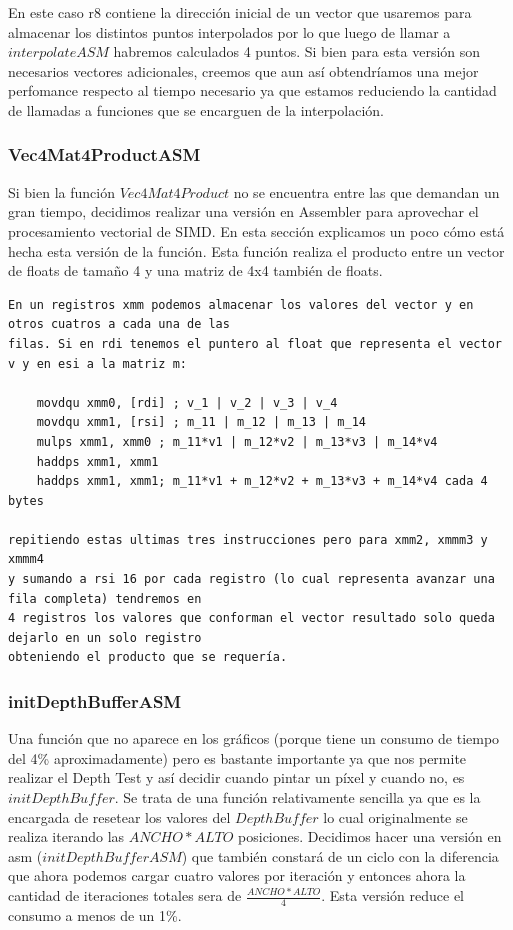 \documentclass[a4paper]{article}
\begin{document}
En este caso r8 contiene la dirección inicial de un vector que usaremos para almacenar los distintos puntos interpolados por lo que luego de llamar a $interpolateASM$ habremos calculados 4 puntos. Si bien para esta versión son necesarios vectores adicionales, creemos que aun así obtendríamos una mejor perfomance respecto al tiempo necesario ya que estamos reduciendo la cantidad de llamadas a funciones que se encarguen de la interpolación.

\subsubsection{Vec4Mat4ProductASM}
Si bien la función $Vec4Mat4Product$ no se encuentra entre las que demandan un gran tiempo, decidimos realizar una versión en Assembler para aprovechar el procesamiento vectorial de SIMD. En esta sección explicamos un poco cómo está hecha esta versión de la función. Esta función realiza el producto entre un vector de floats de tamaño 4 y una matriz de 4x4 también de floats. 
\begin{verbatim}
En un registros xmm podemos almacenar los valores del vector y en otros cuatros a cada una de las 
filas. Si en rdi tenemos el puntero al float que representa el vector v y en esi a la matriz m:

    movdqu xmm0, [rdi] ; v_1 | v_2 | v_3 | v_4
    movdqu xmm1, [rsi] ; m_11 | m_12 | m_13 | m_14
    mulps xmm1, xmm0 ; m_11*v1 | m_12*v2 | m_13*v3 | m_14*v4
    haddps xmm1, xmm1 
    haddps xmm1, xmm1; m_11*v1 + m_12*v2 + m_13*v3 + m_14*v4 cada 4 bytes 
        
repitiendo estas ultimas tres instrucciones pero para xmm2, xmmm3 y xmmm4
y sumando a rsi 16 por cada registro (lo cual representa avanzar una fila completa) tendremos en 
4 registros los valores que conforman el vector resultado solo queda dejarlo en un solo registro 
obteniendo el producto que se requería.
\end{verbatim}

\subsubsection{initDepthBufferASM}
Una función que no aparece en los gráficos (porque tiene un consumo de tiempo del 4\% aproximadamente) pero es bastante importante ya que nos permite realizar el Depth Test y así decidir cuando pintar un píxel y cuando no, es $
initDepthBuffer$. Se trata de una función relativamente sencilla ya que es la encargada de resetear los valores del $DepthBuffer$ lo cual originalmente se realiza iterando las $ANCHO*ALTO$ posiciones. Decidimos hacer una versión en asm ($
initDepthBufferASM$) que también constará de un ciclo con la diferencia que ahora podemos cargar cuatro valores por iteración y entonces ahora la cantidad de iteraciones totales sera de $\frac{ANCHO*ALTO}{4}$. Esta versión reduce el consumo a menos de un 1\%.
\end{document}
